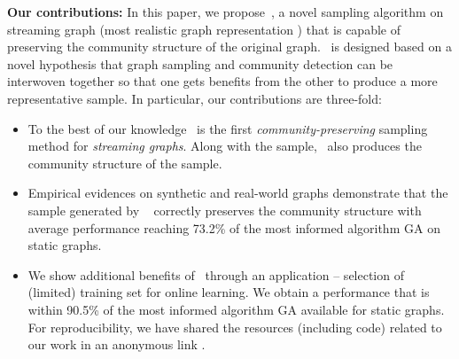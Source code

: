  {\bf Our contributions:} In this paper, we propose~\compas, a novel sampling algorithm on streaming graph (most realistic graph representation \cite{aggarwal2011outlier,ahmed2014network}) that is capable of
 preserving 
 the community structure of the original graph. {
\compas~is designed based on a novel hypothesis that  graph sampling and community detection can be interwoven together so that one gets benefits from the other} 
 to produce a more representative sample. In particular, our contributions are three-fold:
\begin{itemize}
\item To the best of our knowledge \compas~is the first {\em community-preserving} sampling method for {\em streaming graphs}. Along with the sample, \compas~also produces the community structure of the sample.

\item Empirical evidences on synthetic and real-world graphs demonstrate that the sample generated by \compas~ correctly preserves the community structure 
with average performance reaching 73.2\% of the most informed algorithm GA \cite{tong2016novel} on static graphs.

\item We show additional benefits of \compas~through an application -- 
 selection of (limited) training set for online learning. We obtain a performance that is within \iffalse 95.6\% and\fi 90.5\% of the most informed algorithm GA available for static graphs. %
 For reproducibility, we have shared the resources (including code) related to our work in an anonymous link \cite{si}.
 \iffalse for first and second applications respectively.\fi
\end{itemize}









